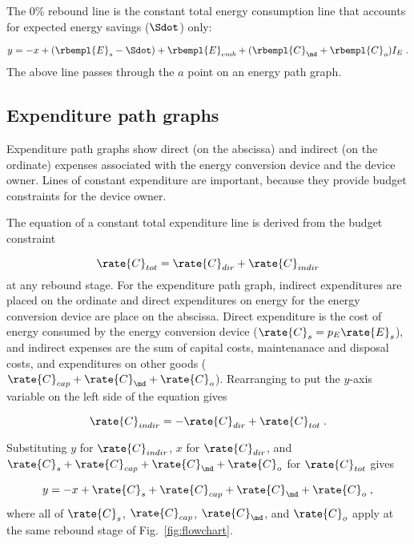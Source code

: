 The 0\% rebound line is the constant total energy consumption line 
that accounts for expected energy savings ($\Sdot$) only:

\begin{equation}
  y = -x + (\rbempl{E}_s - \Sdot)
          + \rbempl{E}_{emb} + (\rbempl{C}_{\md} + \rbempl{C}_o) I_E \; .
\end{equation}
%
The above line passes through the $a$ point on an energy path graph.


\subsection{Expenditure path graphs}
\label{sec:expenditure_path_graph_details}

Expenditure path graphs show direct (on the abscissa) and indirect (on the ordinate)
expenses associated with the energy conversion device 
and the device owner.
Lines of constant expenditure are important, 
because they provide budget constraints for the device owner.

The equation of a constant total expenditure line is derived from 
the budget constraint

\begin{equation}
  \rate{C}_{tot} = \rate{C}_{dir} + \rate{C}_{indir}
\end{equation}
%
at any rebound stage.
For the expenditure path graph,
indirect expenditures are placed on the ordinate
and direct expenditures on energy for the energy conversion device are place on the abscissa.
Direct expenditure is the cost of energy consumed by the energy conversion device
($\rate{C}_s = p_E \rate{E}_s$), and 
indirect expenses are the sum of capital costs, 
maintenanace and disposal costs, and 
expenditures on other goods
($\rate{C}_{cap} + \rate{C}_{\md} + \rate{C}_o$).
Rearranging to put the $y$-axis variable on the left side of the equation gives

\begin{equation}
  \rate{C}_{indir} = - \rate{C}_{dir} + \rate{C}_{tot} \; .
\end{equation}

Substituting $y$ for $\rate{C}_{indir}$, 
$x$ for $\rate{C}_{dir}$, and 
$\rate{C}_s + \rate{C}_{cap} + \rate{C}_{\md} + \rate{C}_o$ for $\rate{C}_{tot}$
gives

\begin{equation}
  y = -x + \rate{C}_s + \rate{C}_{cap} + \rate{C}_{\md} + \rate{C}_o \; ,
\end{equation}
%
where all of $\rate{C}_s$, $\rate{C}_{cap}$, $\rate{C}_{\md}$, and $\rate{C}_o$
apply at the same rebound stage of Fig.~\ref{fig:flowchart}.

